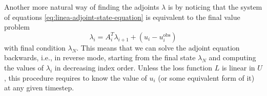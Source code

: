 Another more natural way of finding the adjoints $\lambda$ is by noticing that the system of equations \eqref{eq:linea-adjoint-state-equation} is equivalent to the final value problem 
\begin{equation}
    \lambda_{i} = A_{i}^T \lambda_{i+1} + (u_i - u_i^\text{obs})
    \label{eq:adjoint-discrete-linear-example}
\end{equation}
with final condition $\lambda_N$. 
This means that we can solve the adjoint equation backwards, i.e., in reverse mode, starting from the final state $\lambda_N$ and computing the values of $\lambda_i$ in decreasing index order. 
Unless the loss function $L$ is linear in $U$, this procedure requires to know the value of $u_i$ (or some equivalent form of it) at any given timestep. 





